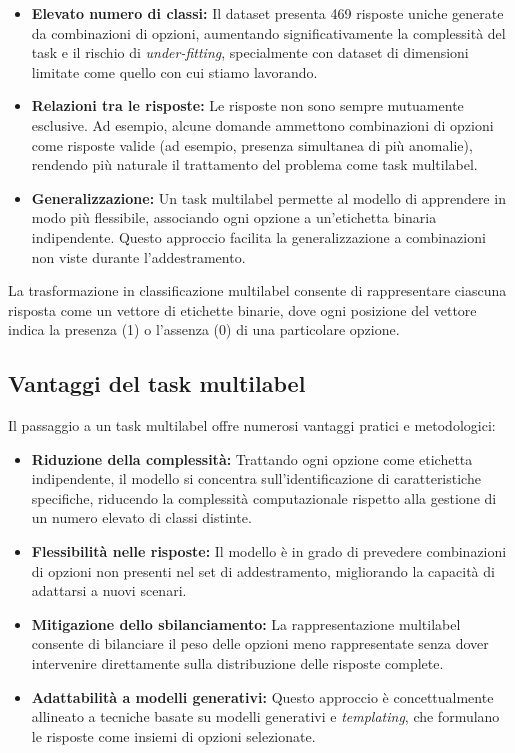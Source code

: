 \documentclass[../main.tex]{subfiles}
\begin{document}
\begin{itemize}
    \item \textbf{Elevato numero di classi:} Il dataset presenta 469 risposte uniche generate da combinazioni di opzioni, aumentando significativamente la complessità del task e il rischio di \textit{under-fitting}, specialmente con dataset di dimensioni limitate come quello con cui stiamo lavorando.
    \item \textbf{Relazioni tra le risposte:} Le risposte non sono sempre mutuamente esclusive. Ad esempio, alcune domande ammettono combinazioni di opzioni come risposte valide (ad esempio, presenza simultanea di più anomalie), rendendo più naturale il trattamento del problema come task multilabel.
    \item \textbf{Generalizzazione:} Un task multilabel permette al modello di apprendere in modo più flessibile, associando ogni opzione a un'etichetta binaria indipendente. Questo approccio facilita la generalizzazione a combinazioni non viste durante l'addestramento.
\end{itemize}

La trasformazione in classificazione multilabel consente di rappresentare ciascuna risposta come un vettore di etichette binarie, dove ogni posizione del vettore indica la presenza (1) o l'assenza (0) di una particolare opzione.

\subsection{Vantaggi del task multilabel}

Il passaggio a un task multilabel offre numerosi vantaggi pratici e metodologici:
\begin{itemize}
    \item \textbf{Riduzione della complessità:} Trattando ogni opzione come etichetta indipendente, il modello si concentra sull'identificazione di caratteristiche specifiche, riducendo la complessità computazionale rispetto alla gestione di un numero elevato di classi distinte.
    \item \textbf{Flessibilità nelle risposte:} Il modello è in grado di prevedere combinazioni di opzioni non presenti nel set di addestramento, migliorando la capacità di adattarsi a nuovi scenari.
    \item \textbf{Mitigazione dello sbilanciamento:} La rappresentazione multilabel consente di bilanciare il peso delle opzioni meno rappresentate senza dover intervenire direttamente sulla distribuzione delle risposte complete.
    \item \textbf{Adattabilità a modelli generativi:} Questo approccio è concettualmente allineato a tecniche basate su modelli generativi e \textit{templating}, che formulano le risposte come insiemi di opzioni selezionate.
\end{itemize}
\end{document}
